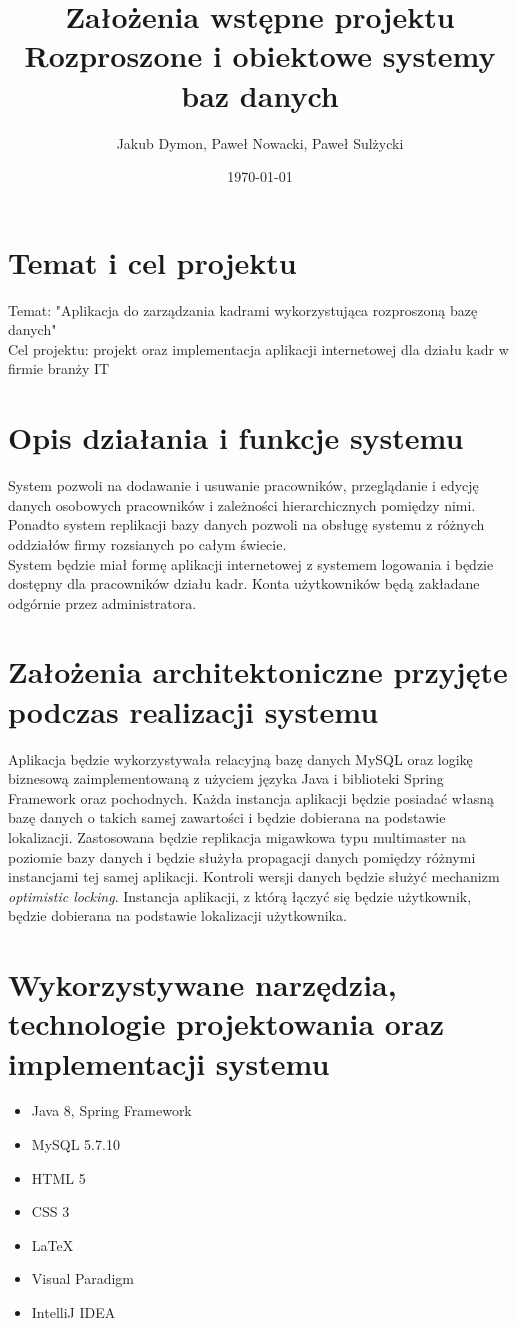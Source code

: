 \documentclass[a4paper,11pt]{article}
\title{
Założenia wstępne projektu\\
\small{Rozproszone i obiektowe systemy baz danych}
}
\author{Jakub Dymon, Paweł Nowacki, Paweł Sulżycki}
\date{\today}
\begin{document}
\maketitle
\section{Temat i cel projektu}
Temat: "Aplikacja do zarządzania kadrami wykorzystująca rozproszoną bazę danych"\\
Cel projektu: projekt oraz implementacja aplikacji internetowej dla działu kadr w firmie branży IT
\section{Opis działania i funkcje systemu}
System pozwoli na dodawanie i usuwanie pracowników, przeglądanie i edycję danych osobowych pracowników i zależności hierarchicznych pomiędzy nimi. Ponadto system replikacji bazy danych pozwoli na obsługę systemu z różnych oddziałów firmy rozsianych po całym świecie.\\
System będzie miał formę aplikacji internetowej z systemem logowania i będzie dostępny dla pracowników działu kadr. Konta użytkowników będą zakładane odgórnie przez administratora.
\section{Założenia architektoniczne przyjęte podczas realizacji systemu}
Aplikacja będzie wykorzystywała relacyjną bazę danych MySQL oraz logikę biznesową zaimplementowaną z użyciem języka Java i biblioteki Spring Framework oraz pochodnych. Każda instancja aplikacji będzie posiadać własną bazę danych o takich samej zawartości i będzie dobierana na podstawie lokalizacji. Zastosowana będzie replikacja  migawkowa typu multimaster na poziomie bazy danych i będzie służyła propagacji danych pomiędzy różnymi instancjami tej samej aplikacji. Kontroli wersji danych będzie służyć mechanizm \textit{optimistic locking}. Instancja aplikacji, z którą łączyć się będzie użytkownik, będzie dobierana na podstawie lokalizacji użytkownika.
\section{Wykorzystywane narzędzia, technologie projektowania oraz implementacji systemu}
\begin{itemize}
	\item Java 8, Spring Framework
	\item MySQL 5.7.10
	\item HTML 5
	\item CSS 3
	\item \LaTeX
	\item Visual Paradigm
	\item IntelliJ IDEA
\end{itemize}
\end{document}

